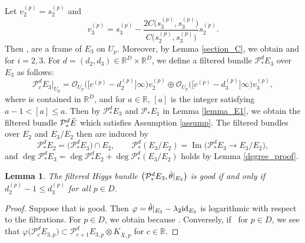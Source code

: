 \documentclass[pdftex]{sigma}
\numberwithin{equation}{section}
\newtheorem{Lemma}[Theorem]{Lemma}
\newcommand{\R}{\mathbb{R}}
\newcommand{\id}{\mathrm{id}}
\newcommand{\Image}{\operatorname{Im}}
\begin{document}
Let $v^{(p)}_2 = s^{(p)}_2$ and
\begin{equation*}
 v^{(p)}_3 = s^{(p)}_3-\frac{2C\bigl(s^{(p)}_3,s^{(p)}_3\bigr)}{C\bigl(s^{(p)}_2,s^{(p)}_3\bigr)}s^{(p)}_2.
\end{equation*}
Then ,  are a frame of $E_3$ on $U_p$. Moreover, by Lemma \ref{section_C}, we obtain  and  for $i=2,3$. For $d=(d_2,d_3)\in \R^D \times \R^D$, we define a filtered bundle $\mathcal{P}^d_{*}E_3$ over $E_3$ as follows:
\begin{equation*}%
 \mathcal{P}^d_{c}E_3|_{U_p} = \mathcal{O}_{U_p}\bigl(\bigl[c^{(p)}-d^{(p)}_2\bigr]\infty\bigr)v^{(p)}_2 \oplus \mathcal{O}_{U_p}\bigl(\bigl[c^{(p)}-d^{(p)}_3\bigr]\infty\bigr)v^{(p)}_3,
\end{equation*}
where  is contained in $\R^{D}$, and for $a\in\R$, $[a]$ is the integer satisfying $a-1<[a]\leq a$.
Then by $\mathcal{P}^d_{*}E_3$ and $\mathcal{P}_{*}E_1$ in Lemma \ref{lemma_E1}, we obtain the filtered bundle $\mathcal{P}_{*}^d \Tilde{E}$ which satisfies Assumption \ref{assump}.
The filtered bundles over $E_2$ and $E_3/E_2$ then are induced by
\begin{equation*}
 \mathcal{P}^{d}_{*}E_2 = \bigl(\mathcal{P}^{d}_{*}E_3\bigr) \cap E_2,\qquad \mathcal{P}^{d}_{*}(E_3/E_2) = \Image\bigl(\mathcal{P}^{d}_{*}E_3 \to E_3/E_2\bigr),
\end{equation*}
and $\deg{\mathcal{P}^{d}_*E_3} = \deg{\mathcal{P}^{d}_*E_2} + \deg{\mathcal{P}^{d}_*(E_3/E_2)}$ holds by Lemma \ref{degree_proof}.

\begin{Lemma}\label{good}
 The filtered Higgs bundle $\bigl(\mathcal{P}^d_*E_3,{\Tilde{\theta}}|_{E_3}\bigr)$ is good if and only if $d^{(p)}_2-1\leq d^{(p)}_3$ for all $p\in D$.
\end{Lemma}
\begin{proof}
 Suppose that  is good. Then $\varphi=\Tilde{\theta}|_{E_3}-\lambda_2\id_{E_3}$ is logarithmic with respect to the filtrations. For $p\in D$, we obtain  because . Conversely, if~ for $p\in D$, we see that $\varphi\bigl(\mathcal{P}^d_{c} E_{3,p}\bigr)\subset \mathcal{P}^d_{c+1} E_{3,p}\otimes K_{\overline{X},p}$ for $c\in\R$.
\end{proof}
\end{document}
